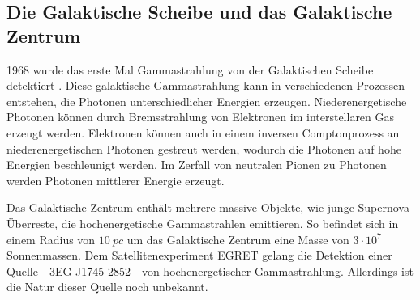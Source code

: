 \subsection{Die Galaktische Scheibe und das Galaktische Zentrum}
1968 wurde das erste Mal Gammastrahlung von der Galaktischen Scheibe detektiert \cite{GalacticPlane}.
Diese galaktische Gammastrahlung kann in verschiedenen Prozessen entstehen, die Photonen unterschiedlicher Energien erzeugen.
Niederenergetische Photonen können durch Bremsstrahlung von Elektronen im interstellaren Gas erzeugt werden.
Elektronen können auch in einem inversen Comptonprozess an niederenergetischen Photonen gestreut werden, wodurch die Photonen auf hohe Energien beschleunigt werden.
Im Zerfall von neutralen Pionen zu Photonen werden Photonen mittlerer Energie erzeugt.





Das Galaktische Zentrum enthält mehrere massive Objekte, wie junge Supernova-Überreste, die hochenergetische Gammastrahlen emittieren.
So befindet sich in einem Radius von $\SI{10}{pc}$ um das Galaktische Zentrum eine Masse von $3\cdot 10^7$ Sonnenmassen. 
Dem Satellitenexperiment EGRET gelang die Detektion einer Quelle - 3EG J1745-2852 - von hochenergetischer Gammastrahlung.
Allerdings ist die Natur dieser Quelle noch unbekannt.\cite{GalacticCenter}\cite{Weekes}





